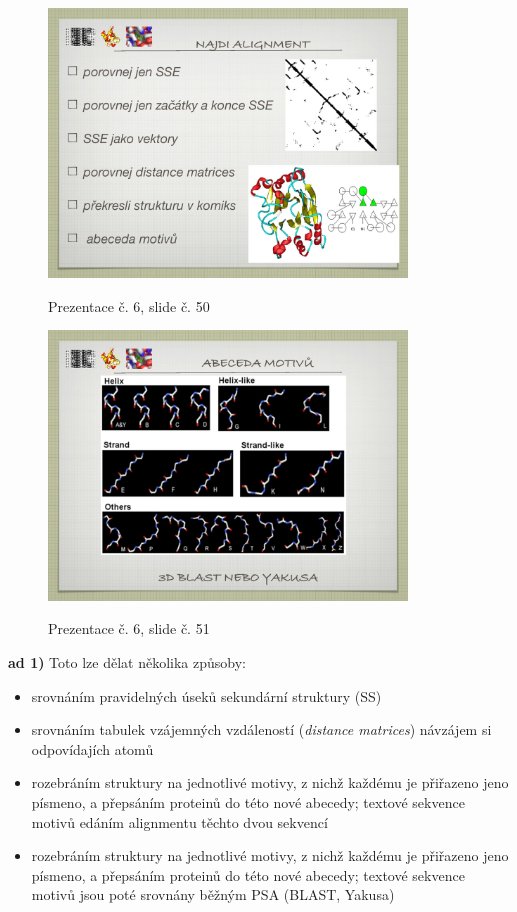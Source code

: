 \documentclass[DIV=8]{scrreprt}
\begin{document}
\begin{figure}
    \caption{Prezentace č. 6, slide č. 50}
    \includegraphics[width=0.85\textwidth]{slides-6/slide-50.jpg}
    \centering
    \label{slides-6-slide-50}
\end{figure}
\begin{figure}
    \caption{Prezentace č. 6, slide č. 51}
    \includegraphics[width=0.85\textwidth]{slides-6/slide-51.jpg}
    \centering
    \label{slides-6-slide-51}
\end{figure}

\textbf{ad 1)} Toto lze dělat několika způsoby:
\begin{itemize}[nosep]
    \item srovnáním pravidelných úseků sekundární struktury (SS)
    \item srovnáním tabulek vzájemných vzdáleností (\emph{distance matrices}) návzájem si odpovídajích atomů
    \item rozebráním struktury na jednotlivé motivy, z nichž každému je přiřazeno jeno písmeno, a přepsáním proteinů do této nové abecedy; textové sekvence motivů edáním alignmentu těchto dvou sekvencí
    \item rozebráním struktury na jednotlivé motivy, z nichž každému je přiřazeno jeno písmeno, a přepsáním proteinů do této nové abecedy; textové sekvence motivů jsou poté srovnány běžným PSA (BLAST, Yakusa)
\end{itemize}
\end{document}
